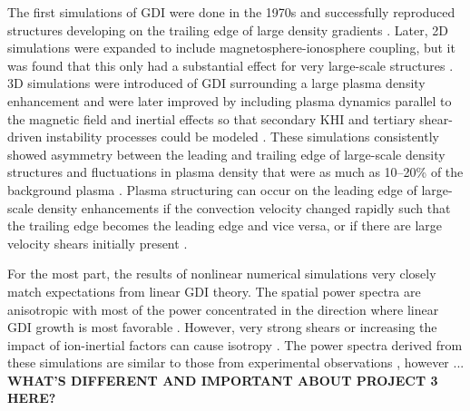 The first simulations of GDI were done in the 1970s and successfully reproduced structures developing on the trailing edge of large density gradients \citep{Zabusky1973,Doles1976,Scannapieco1976,Ossakow1975,Ossakow1977}.  Later, 2D simulations were expanded to include magnetosphere-ionosphere coupling, but it was found that this only had a substantial effect for very large-scale structures \citep{Keskinen1990}.  3D simulations were introduced of GDI surrounding a large plasma density enhancement \citep{Guzdar1998} and were later improved by including plasma dynamics parallel to the magnetic field and inertial effects so that secondary KHI and tertiary shear-driven instability processes could be modeled \citep{Gondarenko1999}.  These simulations consistently showed asymmetry between the leading and trailing edge of large-scale density structures and fluctuations in plasma density that were as much as 10--20\% of the background plasma \citep{Gondarenko2004a,Gondarenko2004b}.  Plasma structuring can occur on the leading edge of large-scale density enhancements if the convection velocity changed rapidly such that the trailing edge becomes the leading edge and vice versa, or if there are large velocity shears initially present \citep{Gondarenko2004a,Gondarenko2004b}.

For the most part, the results of nonlinear numerical simulations very closely match expectations from linear GDI theory.  The spatial power spectra are anisotropic with most of the power concentrated in the direction where linear GDI growth is most favorable \citep{Keskinen1981,Keskinen1982,Gondarenko2001,Gondarenko2004b}.  However, very strong shears or increasing the impact of ion-inertial factors can cause isotropy \citep{Gondarenko2001,Gondarenko2006}.  The power spectra derived from these simulations are similar to those from experimental observations \citep{Baker1978,Kelley1979}, however ... \textbf{WHAT'S DIFFERENT AND IMPORTANT ABOUT PROJECT 3 HERE?}



